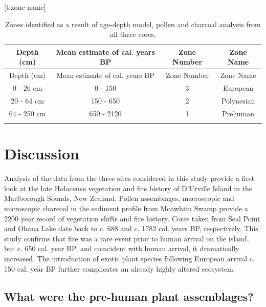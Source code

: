 {[}t:zone-name{]}

\begin{longtable}[]{@{}cccc@{}}
\caption{Zones identified as a result of age-depth model, pollen and
charcoal analysis from all three cores.}\tabularnewline
\toprule
Depth (cm) & Mean estimate of cal. years BP & Zone Number & Zone
Name\tabularnewline
\midrule
\endfirsthead
\toprule
Depth (cm) & Mean estimate of cal. years BP & Zone Number & Zone
Name\tabularnewline
\midrule
\endhead
0 - 20 cm & 0 - 150 & 3 & European\tabularnewline
20 - 64 cm & 150 - 650 & 2 & Polynesian\tabularnewline
64 - 250 cm & 650 - 2120 & 1 & Prehuman\tabularnewline
& & &\tabularnewline
\bottomrule
\end{longtable}

\section{Discussion}\label{discussion}

Analysis of the data from the three sites considered in this study
provide a first look at the late Holocence vegetation and fire history
of D'Urville Island in the Marlborough Sounds, New Zealand. Pollen
assemblages, macroscopic and microscopic charcoal in the sediment
profile from Moawhitu Swamp provide a 2200 year record of vegetation
shifts and fire history. Cores taken from Seal Point and Ohana Lake date
back to c. 688 and c. 1782 cal. years BP, respectively. This study
confirms that fire was a rare event prior to human arrival on the
island, but c. 650 cal. year BP, and coincident with human arrival, it
dramatically increased. The introduction of exotic plant species
following European arrival c. 150 cal. year BP further complicates an
already highly altered ecosystem.

\subsection{What were the pre-human plant
assemblages?}\label{what-were-the-pre-human-plant-assemblages}

